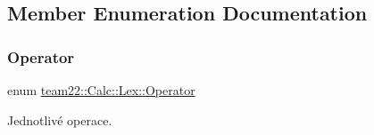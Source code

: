 \subsection{Member Enumeration Documentation}
\mbox{\label{classteam22_1_1_calc_1_1_lex_a61d29fc4878a3b36d2de2f13c56ed932}} 
\subsubsection{\texorpdfstring{Operator}{Operator}}
{\footnotesize\ttfamily enum \hyperlink{classteam22_1_1_calc_1_1_lex_a61d29fc4878a3b36d2de2f13c56ed932}{team22\+::\+Calc\+::\+Lex\+::\+Operator}}



Jednotlivé operace. 

